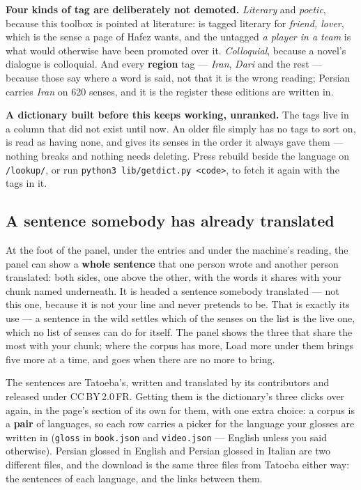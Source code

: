 \documentclass[11pt,oneside]{report}
\newcommand{\pw}[1]{\babelsublr{\mbox{\foreignlanguage{persian}{#1}}}}
\newcommand{\file}[1]{\texttt{#1}}
\newcommand{\menu}[1]{\textsf{#1}}
\begin{document}
\begin{goodbox}
\textbf{Four kinds of tag are deliberately not demoted.} \emph{Literary} and
\emph{poetic}, because this toolbox is pointed at literature: \pw{یار} is
tagged literary for \emph{friend, lover}, which is the sense a page of Hafez
wants, and the untagged \emph{a player in a team} is what would otherwise
have been promoted over it. \emph{Colloquial}, because a novel's dialogue is
colloquial. And every \textbf{region} tag --- \emph{Iran}, \emph{Dari} and
the rest --- because those say where a word is said, not that it is the wrong
reading; Persian carries \emph{Iran} on 620 senses, and it is the register
these editions are written in.
\end{goodbox}

\begin{goodbox}
\textbf{A dictionary built before this keeps working, unranked.} The tags
live in a column that did not exist until now. An older file simply has no
tags to sort on, is read as having none, and gives its senses in the order it
always gave them --- nothing breaks and nothing needs deleting. Press
\menu{rebuild} beside the language on \texttt{/lookup/}, or run
\texttt{python3 lib/getdict.py <code>}, to fetch it again with the tags in
it.
\end{goodbox}

\subsection*{A sentence somebody has already translated}

At the foot of the panel, under the entries and under the machine's reading,
the panel can show a \textbf{whole sentence} that one person wrote and another
person translated: both sides, one above the other, with the words it shares
with your chunk named underneath. It is headed
\menu{a sentence somebody translated --- not this one}, because it is not
your line and never pretends to be. That is exactly its use --- a sentence in
the wild settles which of the senses on the list is the live one, which no
list of senses can do for itself. The panel shows the three that share the
most with your chunk; where the corpus has more, \menu{Load more} under them
brings five more at a time, and goes when there are no more to bring.

The sentences are Tatoeba's, written and translated by its contributors and
released under CC\,BY\,2.0\,FR. Getting them is the dictionary's three clicks
over again, in the page's section of its own for them, with one extra choice: a
corpus is a \textbf{pair} of languages, so each row carries a picker for the
language your glosses are written in (\texttt{gloss} in \file{book.json} and
\file{video.json} --- English unless you said otherwise). Persian glossed in
English and Persian glossed in Italian are two different files, and the
download is the same three files from Tatoeba either way: the sentences of
each language, and the links between them.
\end{document}
